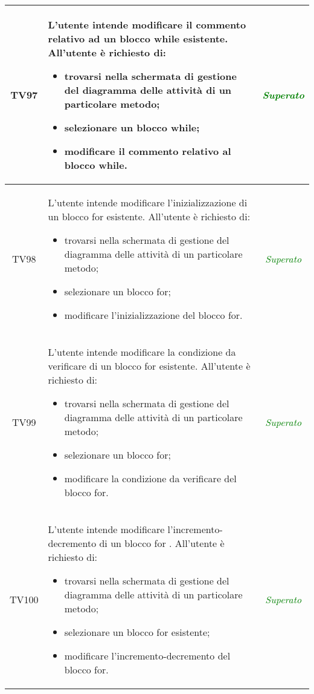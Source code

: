 \begin{longtable}{|c|>{}m{8cm}|c|}
\hypertarget{TV4.23.2}{TV97} & L'utente intende modificare il commento relativo ad un blocco while esistente.
All'utente è richiesto di:
\begin{itemize}
\item trovarsi nella schermata di gestione del diagramma delle attività di un particolare metodo;
\item selezionare un blocco while;
\item modificare il commento relativo al blocco while.
\end{itemize} & \textcolor{Green}{\textit{Superato}}\\ \hline

\hypertarget{TV4.24.1}{TV98} & L'utente intende modificare l'inizializzazione di un blocco for esistente.
All'utente è richiesto di:
\begin{itemize}
	\item trovarsi nella schermata di gestione del diagramma delle attività di un particolare metodo; 
	\item selezionare un blocco for; 
	\item modificare l'inizializzazione del blocco for. 
\end{itemize} & \textcolor{Green}{\textit{Superato}}\\ \hline

\hypertarget{TV4.24.2}{TV99} & L'utente intende modificare la condizione da verificare di un blocco for esistente.
All'utente è richiesto di:
\begin{itemize}
	\item trovarsi nella schermata di gestione del diagramma delle attività di un particolare metodo;
	\item selezionare un blocco for;
	\item modificare la condizione da verificare del blocco for.
\end{itemize} & \textcolor{Green}{\textit{Superato}}\\ \hline

\hypertarget{TV4.24.3}{TV100} & L'utente intende modificare l'incremento-decremento di un blocco for .
All'utente è richiesto di:
\begin{itemize}
	\item trovarsi nella schermata di gestione del diagramma delle attività di un particolare metodo;
	\item selezionare un blocco for esistente;
	\item modificare l'incremento-decremento del blocco for.
\end{itemize} & \textcolor{Green}{\textit{Superato}}\\ \hline


\end{longtable}
